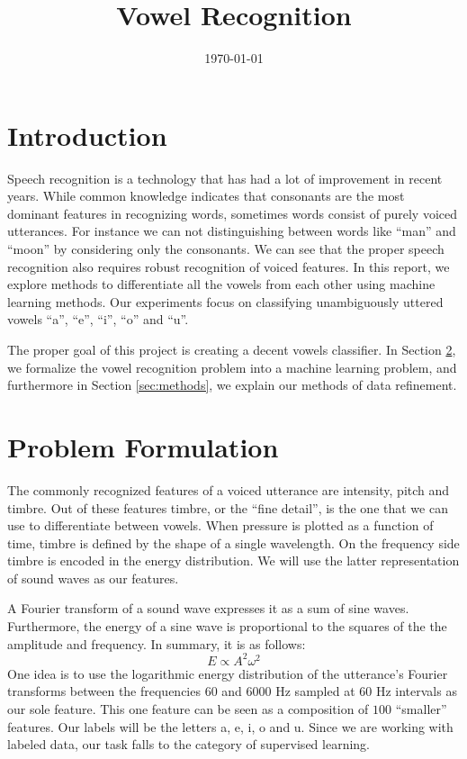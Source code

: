 \documentclass[letterpaper,12pt]{article}
\begin{document}
\title{Vowel Recognition}
\author{}
\date{\today}
\maketitle

\section{Introduction}

Speech recognition is a technology that has had a lot of improvement in recent years. While common knowledge indicates that consonants are the most dominant features in recognizing words, sometimes words consist of purely voiced utterances. For instance we can not distinguishing between words like ``man'' and ``moon'' by considering only the consonants. We can see that the proper speech recognition also requires robust recognition of voiced features. In this report, we explore methods to differentiate all the vowels from each other using machine learning methods. Our experiments focus on classifying unambiguously uttered vowels ``a'', ``e'', ``i'', ``o'' and ``u''.

The proper goal of this project is creating a decent vowels classifier. In Section \ref{sec:problem-formulation}, we formalize the vowel recognition problem into a machine learning problem, and furthermore in Section \ref{sec:methods}, we explain our methods of data refinement. 

\section{Problem Formulation}\label{sec:problem-formulation}

The commonly recognized features of a voiced utterance are intensity, pitch and timbre. Out of these features timbre, or the ``fine detail'', is the one that we can use to differentiate between vowels. When pressure is plotted as a function of time, timbre is defined by the shape of a single wavelength. On the frequency side timbre is encoded in the energy distribution. We will use the latter representation of sound waves as our features.

A Fourier transform of a sound wave expresses it as a sum of sine waves. Furthermore, the energy of a sine wave is proportional to the squares of the the amplitude and frequency. In summary, it is as follows: 
\begin{equation}
E\propto A^2\omega^2
\end{equation}
One idea is to use the logarithmic energy distribution of the utterance's Fourier transforms between the frequencies $60$ and $6000$ Hz sampled at $60$ Hz intervals as our sole feature. This one feature can be seen as a composition of $100$ ``smaller'' features. Our labels will be the letters a, e, i, o and u. Since we are working with labeled data, our task falls to the category of supervised learning.
\end{document}

